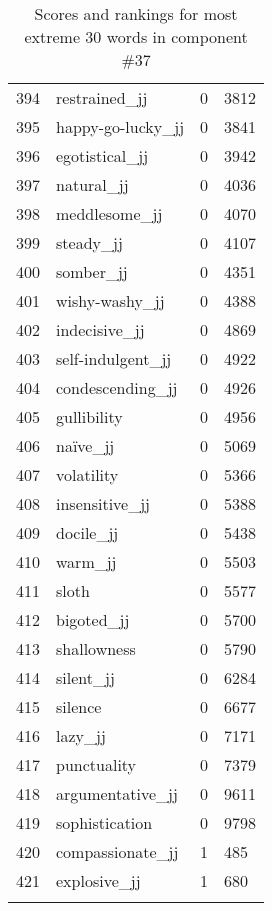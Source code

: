 \begin{longtable}[!htbp]{| rlr@{.}l |}
    394 & restrained\_jj & 0 & 3812 \\
    395 & happy-go-lucky\_jj & 0 & 3841 \\
    396 & egotistical\_jj & 0 & 3942 \\
    397 & natural\_jj & 0 & 4036 \\
    398 & meddlesome\_jj & 0 & 4070 \\
    399 & steady\_jj & 0 & 4107 \\
    400 & somber\_jj & 0 & 4351 \\
    401 & wishy-washy\_jj & 0 & 4388 \\
    402 & indecisive\_jj & 0 & 4869 \\
    403 & self-indulgent\_jj & 0 & 4922 \\
    404 & condescending\_jj & 0 & 4926 \\
    405 & gullibility & 0 & 4956 \\
    406 & naïve\_jj & 0 & 5069 \\
    407 & volatility & 0 & 5366 \\
    408 & insensitive\_jj & 0 & 5388 \\
    409 & docile\_jj & 0 & 5438 \\
    410 & warm\_jj & 0 & 5503 \\
    411 & sloth & 0 & 5577 \\
    412 & bigoted\_jj & 0 & 5700 \\
    413 & shallowness & 0 & 5790 \\
    414 & silent\_jj & 0 & 6284 \\
    415 & silence & 0 & 6677 \\
    416 & lazy\_jj & 0 & 7171 \\
    417 & punctuality & 0 & 7379 \\
    418 & argumentative\_jj & 0 & 9611 \\
    419 & sophistication & 0 & 9798 \\
    420 & compassionate\_jj & 1 & 485 \\
    421 & explosive\_jj & 1 & 680 \\
    \hline
    \caption{Scores and rankings for most extreme 30 words in component \#37} \\
\end{longtable}
